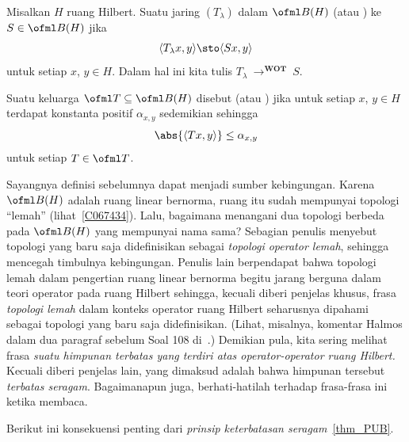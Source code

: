 \begin{defn} Misalkan $H$ ruang Hilbert. Suatu jaring $(T_\lambda)$ dalam $\ofml B(H)$
 (atau ) ke $S \in \ofml B(H)$ jika
  \[ \langle T_\lambda x,y \rangle \sto \langle Sx,y \rangle \]
untuk setiap $x$, $y \in H$. Dalam hal ini kita tulis
$T_\lambda~\to^{\textbf{WOT}}~S$.

Suatu keluarga $\ofml T \subseteq \ofml B(H)$ disebut
 (atau ) jika untuk setiap $x$, $y \in H$
terdapat konstanta positif $\alpha_{x,y}$ sedemikian sehingga
  \[\abs{\langle Tx,y \rangle} \le \alpha_{x,y}\]
untuk setiap $T \in \ofml T$.
\end{defn}

Sayangnya definisi sebelumnya dapat menjadi sumber kebingungan. Karena $\ofml B(H)$ adalah
ruang linear bernorma, ruang itu sudah mempunyai topologi ``lemah'' (lihat~\ref{C067434}). Lalu, bagaimana menangani dua
topologi berbeda pada $\ofml B(H)$ yang mempunyai nama sama? Sebagian penulis menyebut topologi yang baru saja didefinisikan sebagai
\emph{topologi operator lemah}, sehingga mencegah timbulnya kebingungan. Penulis lain berpendapat bahwa
topologi lemah dalam pengertian ruang linear bernorma begitu jarang berguna dalam teori operator pada ruang Hilbert
sehingga, kecuali diberi penjelas khusus, frasa \emph{topologi lemah} dalam konteks operator ruang Hilbert
seharusnya dipahami sebagai topologi yang baru saja didefinisikan. (Lihat, misalnya, komentar Halmos dalam dua
paragraf sebelum Soal 108 di~\cite{Halmos:1982}.) Demikian pula, kita sering melihat frasa \emph{suatu
himpunan terbatas yang terdiri atas operator-operator ruang Hilbert.} Kecuali diberi penjelas lain, yang dimaksud adalah bahwa himpunan
tersebut \emph{terbatas seragam}. Bagaimanapun juga, berhati-hatilah terhadap frasa-frasa ini ketika membaca.

Berikut ini konsekuensi penting dari \emph{prinsip keterbatasan seragam}~\ref{thm_PUB}.

